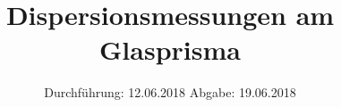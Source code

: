 

\subject{402}
\title{Dispersionsmessungen am Glasprisma}
\date{%
  Durchführung: 12.06.2018
  \hspace{3em}
  Abgabe: 19.06.2018
}



\maketitle
\thispagestyle{empty}
\tableofcontents
\newpage






\printbibliography{}


